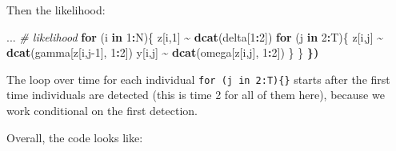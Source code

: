 \documentclass[
  12pt,
]{krantz}
\newenvironment{Shaded}{\begin{snugshade}}{\end{snugshade}}
\newcommand{\CommentTok}[1]{\textcolor[rgb]{0.56,0.35,0.01}{\textit{#1}}}
\newcommand{\ControlFlowTok}[1]{\textcolor[rgb]{0.13,0.29,0.53}{\textbf{#1}}}
\newcommand{\DecValTok}[1]{\textcolor[rgb]{0.00,0.00,0.81}{#1}}
\newcommand{\ErrorTok}[1]{\textcolor[rgb]{0.64,0.00,0.00}{\textbf{#1}}}
\newcommand{\FunctionTok}[1]{\textcolor[rgb]{0.13,0.29,0.53}{\textbf{#1}}}
\newcommand{\NormalTok}[1]{#1}
\newcommand{\SpecialCharTok}[1]{\textcolor[rgb]{0.81,0.36,0.00}{\textbf{#1}}}
\begin{document}
Then the likelihood:

\begin{Shaded}
\begin{Highlighting}[]
\NormalTok{...}
    \CommentTok{\# likelihood}
    \ControlFlowTok{for}\NormalTok{ (i }\ControlFlowTok{in} \DecValTok{1}\SpecialCharTok{:}\NormalTok{N)\{}
\NormalTok{    z[i,}\DecValTok{1}\NormalTok{] }\SpecialCharTok{\textasciitilde{}} \FunctionTok{dcat}\NormalTok{(delta[}\DecValTok{1}\SpecialCharTok{:}\DecValTok{2}\NormalTok{])}
    \ControlFlowTok{for}\NormalTok{ (j }\ControlFlowTok{in} \DecValTok{2}\SpecialCharTok{:}\NormalTok{T)\{}
\NormalTok{      z[i,j] }\SpecialCharTok{\textasciitilde{}} \FunctionTok{dcat}\NormalTok{(gamma[z[i,j}\DecValTok{{-}1}\NormalTok{], }\DecValTok{1}\SpecialCharTok{:}\DecValTok{2}\NormalTok{])}
\NormalTok{      y[i,j] }\SpecialCharTok{\textasciitilde{}} \FunctionTok{dcat}\NormalTok{(omega[z[i,j], }\DecValTok{1}\SpecialCharTok{:}\DecValTok{2}\NormalTok{])}
\NormalTok{    \}}
\NormalTok{  \}}
\ErrorTok{\})}
\end{Highlighting}
\end{Shaded}

The loop over time for each individual \texttt{for\ (j\ in\ 2:T)\{\}} starts after the first time individuals are detected (this is time 2 for all of them here), because we work conditional on the first detection.

Overall, the code looks like:
\end{document}
